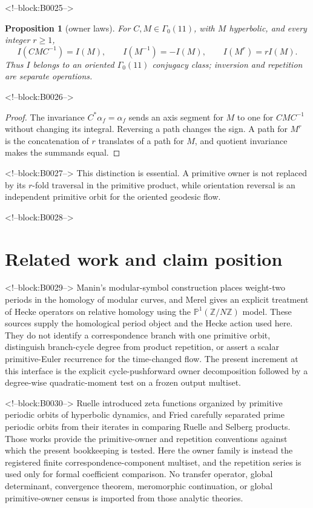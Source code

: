 \documentclass[11pt]{article}
\newtheorem{proposition}[theorem]{Proposition}
\theoremstyle{definition}
\theoremstyle{remark}
\newcommand{\G}{\Gamma_0(11)}
\begin{document}
<!--block:B0025-->
\begin{proposition}[owner laws]\label{prop:owner}
For $C,M\in\G$, with $M$ hyperbolic, and every integer $r\geq1$,
\[
I(CMC^{-1})=I(M),\qquad I(M^{-1})=-I(M),\qquad I(M^r)=rI(M).
\]
Thus $I$ belongs to an oriented $\G$ conjugacy class; inversion and repetition are separate operations.
\end{proposition}

<!--block:B0026-->
\begin{proof}
The invariance $C^*\alpha_f=\alpha_f$ sends an axis segment for $M$ to one for $CMC^{-1}$ without changing its integral. Reversing a path changes the sign. A path for $M^r$ is the concatenation of $r$ translates of a path for $M$, and quotient invariance makes the summands equal.
\end{proof}

<!--block:B0027-->
This distinction is essential. A primitive owner is not replaced by its $r$-fold traversal in the primitive product, while orientation reversal is an independent primitive orbit for the oriented geodesic flow.

<!--block:B0028-->
\section{Related work and claim position}

<!--block:B0029-->
Manin's modular-symbol construction places weight-two periods in the homology of modular curves, and Merel gives an explicit treatment of Hecke operators on relative homology using the $\mathbb P^1(\mathbb Z/N\mathbb Z)$ model.
\citep[Introduction and Sections~1--2]{merel1991}
These sources supply the homological period object and the Hecke action used here. They do not identify a correspondence branch with one primitive orbit, distinguish branch-cycle degree from product repetition, or assert a scalar primitive-Euler recurrence for the time-changed flow. The present increment at this interface is the explicit cycle-pushforward owner decomposition followed by a degree-wise quadratic-moment test on a frozen output multiset.

<!--block:B0030-->
Ruelle introduced zeta functions organized by primitive periodic orbits of hyperbolic dynamics, and Fried carefully separated prime periodic orbits from their iterates in comparing Ruelle and Selberg products.
\citep[Introduction and flow case]{ruelle1976}
\citep[Section~2]{fried1986}
Those works provide the primitive-owner and repetition conventions against which the present bookkeeping is tested. Here the owner family is instead the registered finite correspondence-component multiset, and the repetition series is used only for formal coefficient comparison. No transfer operator, global determinant, convergence theorem, meromorphic continuation, or global primitive-owner census is imported from those analytic theories.
\end{document}
